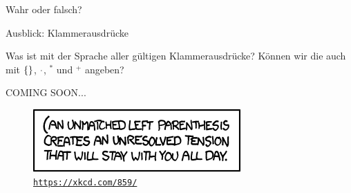 \begin{frame}[t]{Wahr oder falsch?}
\end{frame}





\begin{frame}{Ausblick: Klammerausdrücke}
	
	Was ist mit der Sprache aller gültigen Klammerausdrücke? Können wir die auch mit $\left\{\right\}$, $\cdot$, ${}^*$ und ${}^+$ angeben? \\[1em]
	\pause
	
	\begin{block}{}
		\Large
		\centering
		COMING SOON... \\[1em]
	\end{block}

	\begin{figure}[H]
		\centering
		\includegraphics[scale=0.7]{xkcd/(.png}
		\vspace{-7pt}
		\caption{ \texttt{\url{https://xkcd.com/859/}} }
	\end{figure}
\end{frame}

%

